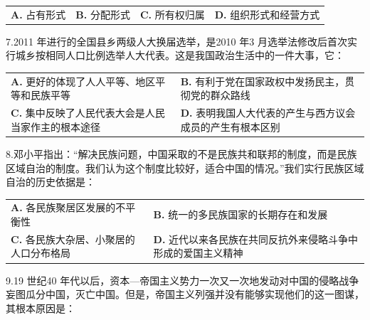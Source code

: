 \documentclass[UTF8,11pt]{ctexart}
\begin{document}
\begin{center}\begin{tabular}{>{\raggedright\arraybackslash}p{\dimexpr(\linewidth-8\tabcolsep)/4\relax}>{\raggedright\arraybackslash}p{\dimexpr(\linewidth-8\tabcolsep)/4\relax}>{\raggedright\arraybackslash}p{\dimexpr(\linewidth-8\tabcolsep)/4\relax}>{\raggedright\arraybackslash}p{\dimexpr(\linewidth-8\tabcolsep)/4\relax}}
\textbf{A.} 占有形式 & \textbf{B.} 分配形式 & \textbf{C.} 所有权归属 & \textbf{D.} 组织形式和经营方式\\[.35em]\end{tabular}\end{center}

7.2011 年进行的全国县乡两级人大换届选举，是2010 年3 月选举法修改后首次实行城乡按相同人口比例选举人大代表。这是我国政治生活中的一件大事，它：


\begin{center}\begin{tabular}{>{\raggedright\arraybackslash}p{\dimexpr(\linewidth-4\tabcolsep)/2\relax}>{\raggedright\arraybackslash}p{\dimexpr(\linewidth-4\tabcolsep)/2\relax}}
\textbf{A.} 更好的体现了人人平等、地区平等和民族平等 & \textbf{B.} 有利于党在国家政权中发扬民主，贯彻党的群众路线\\[.35em]
\textbf{C.} 集中反映了人民代表大会是人民当家作主的根本途径 & \textbf{D.} 表明我国人大代表的产生与西方议会成员的产生有根本区别\\[.35em]\end{tabular}\end{center}

8.邓小平指出：“解决民族问题，中国采取的不是民族共和联邦的制度，而是民族区域自治的制度。我们认为这个制度比较好，适合中国的情况。”我们实行民族区域自治的历史依据是：


\begin{center}\begin{tabular}{>{\raggedright\arraybackslash}p{\dimexpr(\linewidth-4\tabcolsep)/2\relax}>{\raggedright\arraybackslash}p{\dimexpr(\linewidth-4\tabcolsep)/2\relax}}
\textbf{A.} 各民族聚居区发展的不平衡性 & \textbf{B.} 统一的多民族国家的长期存在和发展\\[.35em]
\textbf{C.} 各民族大杂居、小聚居的人口分布格局 & \textbf{D.} 近代以来各民族在共同反抗外来侵略斗争中形成的爱国主义精神\\[.35em]\end{tabular}\end{center}

9.19 世纪40 年代以后，资本—帝国主义势力一次又一次地发动对中国的侵略战争妄图瓜分中国，灭亡中国。但是，帝国主义列强并没有能够实现他们的这一图谋，其根本原因是：
\end{document}

